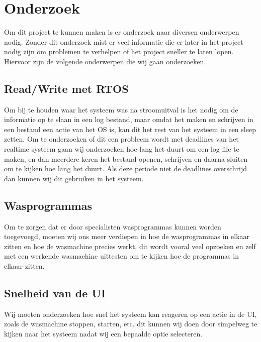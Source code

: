 \chapter{Onderzoek}
Om dit project te kunnen maken is er onderzoek naar diversen onderwerpen nodig. Zonder dit onderzoek mist er veel informatie die er later in het project nodig zijn om problemen te verhelpen of het project sneller te laten lopen.
Hiervoor zijn de volgende onderwerpen die wij gaan onderzoeken.

\section {Read/Write met RTOS}
Om bij te houden waar het systeem was na stroomuitval is het nodig om de informatie op te slaan in een log bestand, maar omdat het maken en schrijven in een 
bestand een actie van het OS is, kan dit het rest van het systeem in een sleep zetten. Om te onderzoeken of dit een probleem wordt met deadlines van het realtime systeem gaan wij 
onderzoeken hoe lang het duurt om een log file te maken, en dan meerdere keren het bestand openen, schrijven en daarna sluiten om te kijken hoe lang het duurt. Als deze periode niet de 
deadlines overschrijd dan kunnen wij dit gebruiken in het systeem.

\section{Wasprogrammas}
Om te zorgen dat er door specialisten wasprogrammas kunnen worden toegevoegd, moeten wij ons meer verdiepen in hoe de wasprogrammas in elkaar zitten en hoe de 
wasmachine precies werkt, dit wordt vooral veel opzoeken en zelf met een werkende wasmachine uittesten om te kijken hoe de programmas in elkaar zitten.

\section{Snelheid van de UI}
Wij moeten onderzoeken hoe snel het systeem kan reageren op een actie in de UI, zoals de wasmachine stoppen, starten, etc. dit kunnen wij doen door simpelweg te 
kijken naar het systeem nadat wij een bepaalde optie selecteren. 

